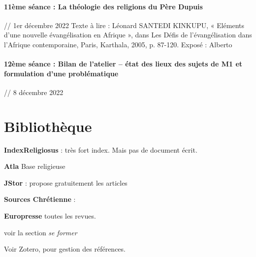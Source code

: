 \paragraph{11ème séance : La théologie des religions du Père Dupuis} // 1er décembre 2022
Texte à lire : Léonard SANTEDI KINKUPU, « Eléments d’une nouvelle évangélisation en Afrique », dans Les Défis de l’évangélisation dans l’Afrique contemporaine, Paris, Karthala, 2005, p. 87-120.
Exposé : Alberto

\paragraph{12ème séance : Bilan de l’atelier – état des lieux des sujets de M1 et formulation d’une problématique} // 8 décembre 2022



\section{Bibliothèque}
 
 
 \textbf{IndexReligiosus} : très fort index.  Mais pas de document écrit.
 
 \textbf{Atla} Base religieuse
 
 \textbf{JStor} : propose gratuitement les articles 

 \textbf{Sources Chrétienne} :
 
 \textbf{Europresse} toutes les revues.
 
 
 \begin{Synthesis}
 voir la section \textit{se former}
 
 \end{Synthesis}

Voir Zotero, pour gestion des références.



